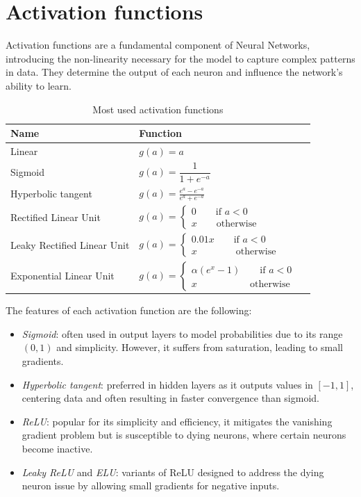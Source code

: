 \section{Activation functions}

Activation functions are a fundamental component of Neural Networks, introducing the non-linearity necessary for the model to capture complex patterns in data.
They determine the output of each neuron and influence the network's ability to learn.
\renewcommand*{\arraystretch}{2}
\begin{table}[H]
    \centering
    \begin{tabular}{|l|l|l|}
    \hline
    \textbf{Name}      & \textbf{Function}  \\ \hline
    Linear             &  $g(a)=a$                 \\ \hline
    Sigmoid            &  $g(a)=\dfrac{1}{1+e^{-a}}$            \\ \hline
    Hyperbolic tangent & $g(a)=\frac{e^a-e^{-a}}{e^a+e^{-a}}$                  \\ \hline
    Rectified Linear Unit & $g(a)=\begin{cases} 0 \qquad \text{if }a<0 \\ x \qquad \text{otherwise}\end{cases}$  \\ \hline
    Leaky Rectified Linear Unit & $g(a)=\begin{cases} 0.01x \qquad \text{if }a<0 \\ x \qquad\qquad \text{otherwise}\end{cases}$  \\ \hline
    Exponential Linear Unit & $g(a)=\begin{cases} \alpha(e^x-1) \qquad \text{if }a<0 \\ x \qquad\qquad\quad\:\: \text{otherwise}\end{cases}$  \\ \hline
    \end{tabular}
    \caption{Most used activation functions}
\end{table}
\renewcommand*{\arraystretch}{1}
\noindent The features of each activation function are the following:
\begin{itemize}
    \item \textit{Sigmoid}: often used in output layers to model probabilities due to its range $(0, 1)$ and simplicity. 
        However, it suffers from saturation, leading to small gradients.
    \item \textit{Hyperbolic tangent}: preferred in hidden layers as it outputs values in $[-1, 1]$, centering data and often resulting in faster convergence than sigmoid.
    \item \textit{ReLU}: popular for its simplicity and efficiency, it mitigates the vanishing gradient problem but is susceptible to dying neurons, where certain neurons become inactive.
    \item \textit{Leaky ReLU} and \textit{ELU}: variants of ReLU designed to address the dying neuron issue by allowing small gradients for negative inputs.
\end{itemize}

